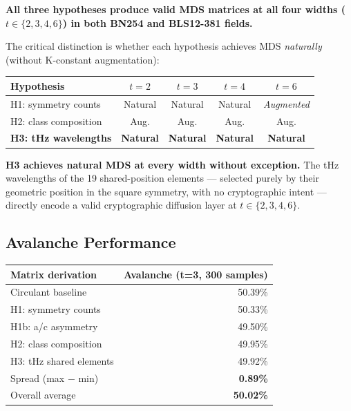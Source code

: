 \documentclass[preprint]{iacrtrans}
\begin{document}
\textbf{All three hypotheses produce valid MDS matrices at all four widths
($t \in \{2,3,4,6\}$) in both BN254 and BLS12-381 fields.}

The critical distinction is whether each hypothesis achieves MDS
\emph{naturally} (without K-constant augmentation):

\begin{center}
\begin{tabular}{lcccc}
\toprule
Hypothesis & $t=2$ & $t=3$ & $t=4$ & $t=6$ \\
\midrule
H1: symmetry counts    & Natural & Natural & Natural & \emph{Augmented} \\
H2: class composition  & Aug.    & Aug.    & Aug.    & Aug. \\
\textbf{H3: tHz wavelengths} & \textbf{Natural} & \textbf{Natural} & \textbf{Natural} & \textbf{Natural} \\
\bottomrule
\end{tabular}
\end{center}

\textbf{H3 achieves natural MDS at every width without exception.} The tHz
wavelengths of the 19 shared-position elements — selected purely by their
geometric position in the square symmetry, with no cryptographic intent —
directly encode a valid cryptographic diffusion layer at $t \in \{2,3,4,6\}$.

\subsection{Avalanche Performance}

\begin{center}
\begin{tabular}{lr}
\toprule
Matrix derivation & Avalanche (t=3, 300 samples) \\
\midrule
Circulant baseline          & 50.39\% \\
H1: symmetry counts         & 50.33\% \\
H1b: a/c asymmetry          & 49.50\% \\
H2: class composition       & 49.95\% \\
H3: tHz shared elements     & 49.92\% \\
\midrule
Spread (max $-$ min)        & \textbf{0.89\%} \\
Overall average             & \textbf{50.02\%} \\
\bottomrule
\end{tabular}
\end{center}
\end{document}

